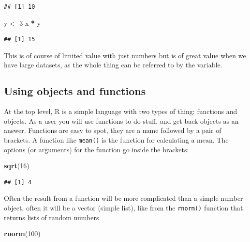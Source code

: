 \documentclass[
]{book}
\newenvironment{Shaded}{\begin{snugshade}}{\end{snugshade}}
\newcommand{\DecValTok}[1]{\textcolor[rgb]{0.00,0.00,0.81}{#1}}
\newcommand{\KeywordTok}[1]{\textcolor[rgb]{0.13,0.29,0.53}{\textbf{#1}}}
\newcommand{\NormalTok}[1]{#1}
\newcommand{\OperatorTok}[1]{\textcolor[rgb]{0.81,0.36,0.00}{\textbf{#1}}}
\newcommand{\StringTok}[1]{\textcolor[rgb]{0.31,0.60,0.02}{#1}}
\begin{document}
\begin{verbatim}
## [1] 10
\end{verbatim}

\begin{Shaded}
\begin{Highlighting}[]
\NormalTok{y <-}\StringTok{ }\DecValTok{3}
\NormalTok{x }\OperatorTok{*}\StringTok{ }\NormalTok{y}
\end{Highlighting}
\end{Shaded}

\begin{verbatim}
## [1] 15
\end{verbatim}

This is of course of limited value with just numbers but is of great value when we have large datasets, as the whole thing can be referred to by the variable.

\hypertarget{using-objects-and-functions}{%
\subsection{Using objects and functions}\label{using-objects-and-functions}}

At the top level, R is a simple language with two types of thing: functions and objects. As a user you will use functions to do stuff, and get back objects as an answer. Functions are easy to spot, they are a name followed by a pair of brackets. A function like \texttt{mean()} is the function for calculating a mean. The options (or arguments) for the function go inside the brackets:

\begin{Shaded}
\begin{Highlighting}[]
\KeywordTok{sqrt}\NormalTok{(}\DecValTok{16}\NormalTok{)}
\end{Highlighting}
\end{Shaded}

\begin{verbatim}
## [1] 4
\end{verbatim}

Often the result from a function will be more complicated than a simple number object, often it will be a vector (simple list), like from the \texttt{rnorm()} function that returns lists of random numbers

\begin{Shaded}
\begin{Highlighting}[]
\KeywordTok{rnorm}\NormalTok{(}\DecValTok{100}\NormalTok{)}
\end{Highlighting}
\end{Shaded}
\end{document}
